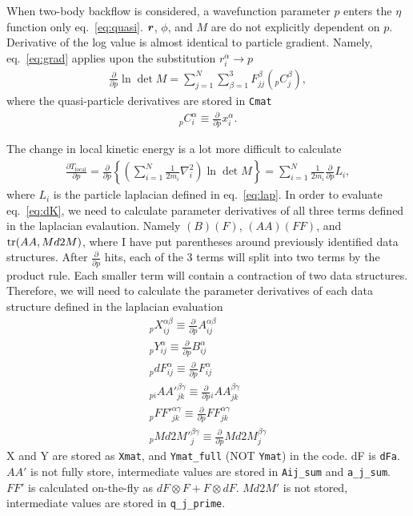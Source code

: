 When two-body backflow is considered, a wavefunction parameter $p$ enters the $\eta$ function only eq.~\ref{eq:quasi}. $\boldsymbol{r}$, $\phi$, and $M$ are do not explicitly dependent on $p$. Derivative of the log value is almost identical to particle gradient. Namely, eq.~\ref{eq:grad} applies upon the substitution $r_i^\alpha\rightarrow p$
\begin{align}
\frac{\partial}{\partial p} \ln\det M = \sum\limits_{j=1}^N \sum\limits_{\beta=1}^3 F_{jj}^\beta \left({}_pC_{j}^{\beta}\right),
\end{align}
where the quasi-particle derivatives are stored in \verb|Cmat|
\begin{align}
{}_pC_{i}^{\alpha} \equiv \frac{\partial}{\partial p} x_{i}^{\alpha}.
\end{align}

The change in local kinetic energy is a lot more difficult to calculate
\begin{align}
\frac{\partial T_{\text{local}}}{\partial p} = \frac{\partial}{\partial p} \left\{ \left( \sum\limits_{i=1}^N \frac{1}{2m_i} \nabla^2_i \right) \ln \det M \right\} = \sum\limits_{i=1}^N \frac{1}{2m_i} \frac{\partial}{\partial p} L_i, \label{eq:dK}
\end{align}
where $L_i$ is the particle laplacian defined in eq.~\ref{eq:lap}. In order to evaluate eq.~\ref{eq:dK}, we need to calculate parameter derivatives of all three terms defined in the laplacian evalaution. Namely $(B)(F)$, $(AA)(FF)$, and $\text{tr}(AA,Md2M)$, where I have put parentheses around previously identified data structures. After $\frac{\partial}{\partial p}$ hits, each of the 3 terms will split into two terms by the product rule. Each smaller term will contain a contraction of two data structures. Therefore, we will need to calculate the parameter derivatives of each data structure defined in the laplacian evaluation
\begin{align}
{}_pX_{ij}^{\alpha\beta} \equiv \frac{\partial}{\partial p} A_{ij}^{\alpha\beta} \\
{}_pY_{ij}^{\alpha} \equiv \frac{\partial}{\partial p} B_{ij}^{\alpha} \\
{}_pdF_{ij}^{\alpha} \equiv \frac{\partial}{\partial p} F_{ij}^{\alpha} \\
{}_{pi}{AA'}_{jk}^{\beta\gamma} \equiv \frac{\partial}{\partial p}  {}_iAA_{jk}^{\beta\gamma} \\
{}_p {FF'}_{jk}^{\alpha\gamma} \equiv \frac{\partial}{\partial p} FF_{jk}^{\alpha\gamma} \\
{}_p {Md2M'}_{j}^{\beta\gamma} \equiv \frac{\partial}{\partial p} Md2M_j^{\beta\gamma}
\end{align}
X and Y are stored as \verb|Xmat|, and \verb|Ymat_full| (NOT \verb|Ymat|) in the code. dF is \verb|dFa|. $AA'$ is not fully store, intermediate values are stored in \verb|Aij_sum| and \verb|a_j_sum|. $FF'$ is calculated on-the-fly as $dF\otimes F+F\otimes dF$. $Md2M'$ is not stored, intermediate values are stored in \verb|q_j_prime|.
